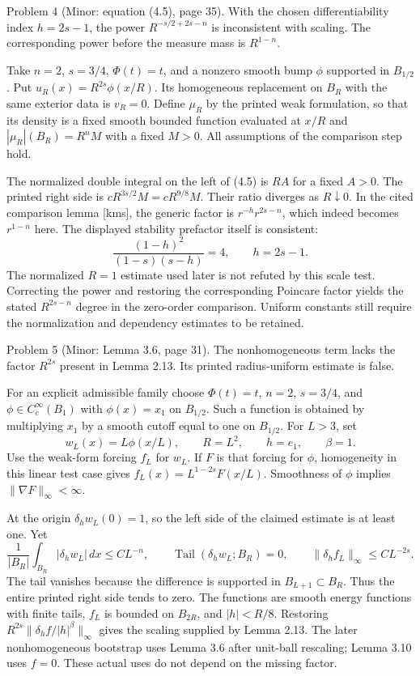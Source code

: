 \documentclass[10pt]{article}
\begin{document}
Problem 4 (Minor: equation (4.5), page 35).  With the chosen differentiability index \(h=2s-1\), the power \(R^{-s/2+2s-n}\) is inconsistent with scaling. The corresponding power before the measure mass is \(R^{1-n}\).\par
Take \(n=2\), \(s=3/4\), \(\Phi(t)=t\), and a nonzero smooth bump \(\phi\) supported in \(B_{1/2}\). Put \(u_R(x)=R^{2s}\phi(x/R)\). Its homogeneous replacement on \(B_R\) with the same exterior data is \(v_R=0\). Define \(\mu_R\) by the printed weak formulation, so that its density is a fixed smooth bounded function evaluated at \(x/R\) and \(|\mu_R|(B_R)=R^nM\) with a fixed \(M>0\). All assumptions of the comparison step hold.\par
The normalized double integral on the left of (4.5) is \(R A\) for a fixed \(A>0\). The printed right side is \(cR^{3s/2}M=cR^{9/8}M\). Their ratio diverges as \(R\downarrow0\). In the cited comparison lemma [kms], the generic factor is \(r^{-h}r^{2s-n}\), which indeed becomes \(r^{1-n}\) here. The displayed stability prefactor itself is consistent: \[\frac{(1-h)^2}{(1-s)(s-h)}=4,\qquad h=2s-1.\] The normalized \(R=1\) estimate used later is not refuted by this scale test. Correcting the power and restoring the corresponding Poincare factor yields the stated \(R^{2s-n}\) degree in the zero-order comparison. Uniform constants still require the normalization and dependency estimates to be retained.\par
Problem 5 (Minor: Lemma 3.6, page 31).  The nonhomogeneous term lacks the factor \(R^{2s}\) present in Lemma 2.13. Its printed radius-uniform estimate is false.\par
For an explicit admissible family choose \(\Phi(t)=t\), \(n=2\), \(s=3/4\), and \(\phi\in C_c^\infty(B_1)\) with \(\phi(x)=x_1\) on \(B_{1/2}\). Such a function is obtained by multiplying \(x_1\) by a smooth cutoff equal to one on \(B_{1/2}\). For \(L>3\), set \[w_L(x)=L\phi(x/L),\qquad R=L^2,\qquad h=e_1,\qquad\beta=1.\] Use the weak-form forcing \(f_L\) for \(w_L\). If \(F\) is that forcing for \(\phi\), homogeneity in this linear test case gives \(f_L(x)=L^{1-2s}F(x/L)\). Smoothness of \(\phi\) implies \(\|\nabla F\|_\infty<\infty\).\par
At the origin \(\delta_hw_L(0)=1\), so the left side of the claimed estimate is at least one. Yet \[\frac{1}{|B_R|}\int_{B_R}|\delta_hw_L|\,dx\leq CL^{-n},\qquad
 \operatorname{Tail}(\delta_hw_L;B_R)=0,\qquad
 \|\delta_hf_L\|_\infty\leq CL^{-2s}.\] The tail vanishes because the difference is supported in \(B_{L+1}\subset B_R\). Thus the entire printed right side tends to zero. The functions are smooth energy functions with finite tails, \(f_L\) is bounded on \(B_{2R}\), and \(|h|<R/8\). Restoring \(R^{2s}\|\delta_hf/|h|^\beta\|_\infty\) gives the scaling supplied by Lemma 2.13. The later nonhomogeneous bootstrap uses Lemma 3.6 after unit-ball rescaling; Lemma 3.10 uses \(f=0\). These actual uses do not depend on the missing factor.\par
\end{document}
